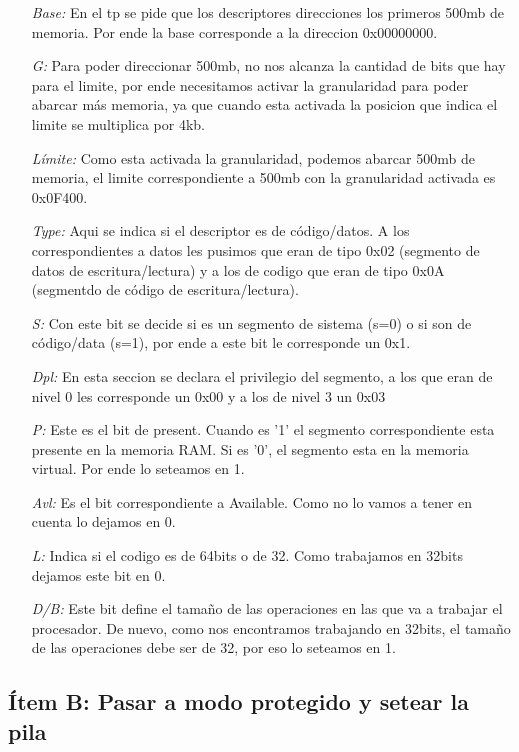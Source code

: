 \begin{itemize}
\item [\textit{Base:}] En el tp se pide que los descriptores direcciones los primeros 500mb de memoria. Por ende la base corresponde a la direccion 0x00000000.
\item [\textit{G:}]  Para poder direccionar 500mb, no nos alcanza la cantidad de bits que hay para el limite, por ende necesitamos activar la granularidad para poder abarcar más memoria, ya que cuando esta activada la posicion que indica el limite se multiplica por 4kb.
\item [\textit{Límite:}] Como esta activada la granularidad, podemos abarcar 500mb de memoria, el limite correspondiente a 500mb con la granularidad activada es 0x0F400.
\item [\textit{Type:}] Aqui se indica si el descriptor es de código/datos. A los correspondientes a datos les pusimos que eran de tipo 0x02 (segmento de datos de escritura/lectura) y a los de codigo que eran de tipo 0x0A (segmentdo de código de escritura/lectura).
\item [\textit{S:}] Con este bit se decide si es un segmento de sistema (s=0) o si son de código/data (s=1), por ende a este bit le corresponde un 0x1.
\item [\textit{Dpl:}] En esta seccion se declara el privilegio del segmento, a los que eran de nivel 0 les corresponde un 0x00 y a los de nivel 3 un 0x03
\item [\textit{P:}] Este es el bit de present. Cuando es ’1’ el segmento correspondiente esta presente en la memoria RAM. Si es ’0’, el segmento esta en la memoria virtual. Por ende lo seteamos en 1.
\item [\textit{Avl:}] Es el bit correspondiente a Available. Como no lo vamos a tener en cuenta lo dejamos en 0.
\item [\textit{L:}] Indica si el codigo es de 64bits o de 32. Como trabajamos en 32bits dejamos este bit en 0.
\item [\textit{D/B:}] Este bit define el tamaño de las operaciones en las que va a trabajar el procesador. De nuevo, como nos encontramos trabajando en 32bits, el tamaño de las operaciones debe ser de 32, por eso lo seteamos en 1.
\end{itemize}

\subsection{Ítem B: Pasar a modo protegido y setear la pila}









